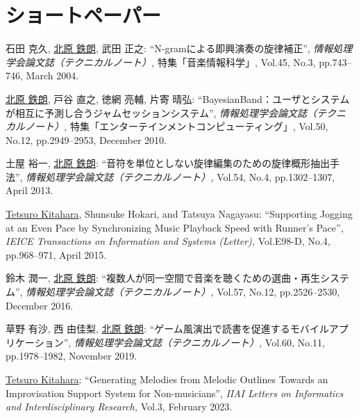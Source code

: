\section*{ショートペーパー}
\begin{Enumerate}
  
\item 
石田 克久, 
\underline{北原 鉄朗}, 
武田 正之: 
    ``N-gramによる即興演奏の旋律補正'', 
    {\it 情報処理学会論文誌（テクニカルノート）,
    } 特集「音楽情報科学」, Vol.45, No.3, pp.743--746, March 2004. 

\item 
\underline{北原 鉄朗}, 
戸谷 直之, 
徳網 亮輔, 
片寄 晴弘: 
    ``BayesianBand：ユーザとシステムが相互に予測し合うジャムセッションシステム'', 
    {\it 情報処理学会論文誌（テクニカルノート）,
    } 特集「エンターテインメントコンピューティング」, Vol.50, No.12, pp.2949--2953, December 2010. 

\item 
土屋 裕一, 
\underline{北原 鉄朗}: 
    ``音符を単位としない旋律編集のための旋律概形抽出手法'', 
    {\it 情報処理学会論文誌（テクニカルノート）,
    } Vol.54, No.4, pp.1302--1307, April 2013. 

\item 
\underline{Tetsuro Kitahara}, 
Shunsuke Hokari, 
and 
Tatsuya Nagayasu: 
    ``Supporting Jogging at an Even Pace by Synchronizing Music
Playback Speed with Runner's Pace'', 
    {\it IEICE Transactions on Information and Systems (Letter),
    } Vol.E98-D, No.4, pp.968--971, April 2015. 

\item 
鈴木 潤一, 
\underline{北原 鉄朗}: 
    ``複数人が同一空間で音楽を聴くための選曲・再生システム'', 
    {\it 情報処理学会論文誌（テクニカルノート）,
    } Vol.57, No.12, pp.2526--2530, December 2016. 

\item 
草野 有沙, 
西 由佳梨, 
\underline{北原 鉄朗}: 
    ``ゲーム風演出で読書を促進するモバイルアプリケーション'', 
    {\it 情報処理学会論文誌（テクニカルノート）,
    } Vol.60, No.11, pp.1978--1982, November 2019. 

\item 
\underline{Tetsuro Kitahara}: 
    ``Generating Melodies from Melodic Outlines Towards an Improvisation Support System for Non-musicians'', 
    {\it IIAI Letters on Informatics and Interdisciplinary Research,
    } Vol.3, February 2023. 

\end{Enumerate}


